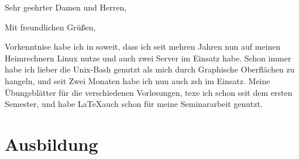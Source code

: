 \documentclass[11pt,a4paper,sans]{moderncv}        %
\begin{document}


\date{\today}
\opening{Sehr geehrter Damen und Herren,}
\closing{Mit freundlichen Grüßen, \vspace{0,3cm} \\ %
}
\makelettertitle



Vorkenntnise habe ich in soweit, dass ich seit mehren Jahren nun auf meinen Heimrechnern Linux nutze und auch zwei Server im Einsatz habe.
Schon immer habe ich lieber die Unix-Bash genutzt als mich durch Graphische Oberflächen zu hangeln, und seit Zwei Monaten habe ich nun auch zsh im Einsatz.
Meine Übungsblätter für die verschiedenen Vorlesungen, texe ich schon seit dem ersten Semester, und habe \LaTeX  auch schon für meine Seminararbeit genutzt.


\bigskip


\makeletterclosing

\newpage


\makecvtitle

\section{Ausbildung}

\end{document}
